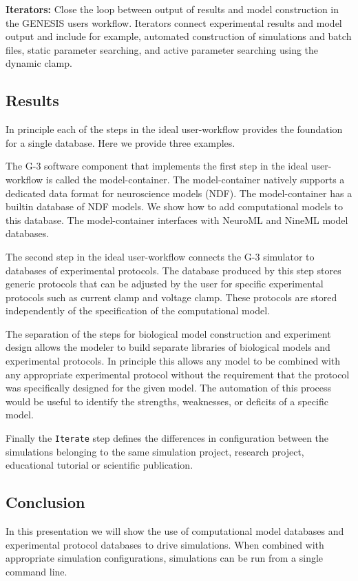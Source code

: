 \documentclass[12pt]{article}
\begin{document}
{\bf Iterators:} Close the loop between output of results and model
construction in the GENESIS users workflow. Iterators connect
experimental results and model output and include for example,
automated construction of simulations and batch files, static
parameter searching, and active parameter searching using the dynamic
clamp.

\subsection*{Results}

In principle each of the steps in the ideal user-workflow provides the
foundation for a single database.  Here we provide three examples.

The G-3 software component that implements the first step in the ideal
user-workflow is called the model-container.  The model-container
natively supports a dedicated data format for neuroscience models
(NDF).  The model-container has a builtin database of NDF models.  We
show how to add computational models to this database.  The
model-container interfaces with NeuroML and NineML model databases.

The second step in the ideal user-workflow connects the G-3 simulator
to databases of experimental protocols.  The database produced by this
step stores generic protocols that can be adjusted by the user for
specific experimental protocols such as current clamp and voltage
clamp.  These protocols are stored independently of the specification
of the computational model.

The separation of the steps for biological model construction and
experiment design allows the modeler to build separate libraries of
biological models and experimental protocols.  In principle this
allows any model to be combined with any appropriate experimental
protocol without the requirement that the protocol was specifically
designed for the given model.  The automation of this process would be
useful to identify the strengths, weaknesses, or deficits of a
specific model.

Finally the {\tt Iterate} step defines the differences in
configuration between the simulations belonging to the same simulation
project, research project, educational tutorial or scientific
publication.

\subsection*{Conclusion}

In this presentation we will show the use of computational model
databases and experimental protocol databases to drive simulations.
When combined with appropriate simulation configurations, simulations
can be run from a single command line.
\end{document}
